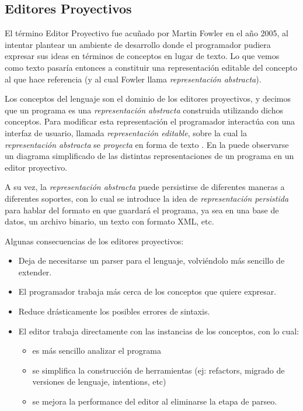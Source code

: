
\subsection{Editores Proyectivos}

El término Editor Proyectivo fue acuñado por Martin Fowler  en el año 2005, al intentar plantear un ambiente de desarrollo donde el programador pudiera expresar sus ideas en términos de conceptos en lugar de texto. Lo que vemos como texto pasaría entonces a constituir una representación editable del concepto al que hace referencia (y al cual Fowler llama \textit{representación abstracta}).

Los conceptos del lenguaje son el dominio de los editores proyectivos, y decimos que un programa es una \textit{representación abstracta} construida utilizando dichos conceptos. Para modificar esta representación el programador interactúa con una interfaz de usuario, llamada \textit{representación editable}, sobre la cual la \textit{representación abstracta} se \textit{proyecta} en forma de texto \cite{voelter2014projectional}. En la  puede observarse un diagrama simplificado de las distintas representaciones de un programa en un editor proyectivo.


A su vez, la \textit{representación abstracta} puede persistirse de diferentes maneras a diferentes soportes, con lo cual se introduce la idea de \textit{representación persistida} para hablar del formato en que guardará el programa, ya sea en una base de datos, un archivo binario, un texto con formato XML, etc.


Algunas consecuencias de los editores proyectivos:
\begin{itemize}
  \item Deja de necesitarse un parser para el lenguaje, volviéndolo más sencillo de extender.
  \item El programador trabaja más cerca de los conceptos que quiere expresar.
  \item Reduce drásticamente los posibles errores de sintaxis.
  \item El editor trabaja directamente con las instancias de los conceptos, con lo cual:
  \begin{itemize}
    \item es más sencillo analizar el programa
    \item se simplifica la construcción de herramientas (ej: refactors, migrado de versiones de lenguaje, intentions, etc)
    \item se mejora la performance del editor al eliminarse la etapa de parseo.
  \end{itemize}
\end{itemize}

